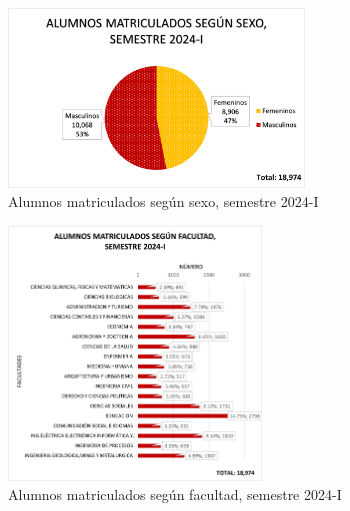 \documentclass[
  12pt,
  letterpaper,
]{scrreprt}
\begin{document}
\begin{figure}[H]

\caption{Alumnos matriculados según sexo, semestre 2024-I}

{\centering \includegraphics[width=0.7\textwidth,height=\textheight]{imagen/imagen3.png}

}

\end{figure}%
\begin{figure}[H]

\caption{Alumnos matriculados según facultad, semestre 2024-I}

{\centering \includegraphics[width=0.6\textwidth,height=\textheight]{imagen/imagen5.png}

}

\end{figure}%
\end{document}
